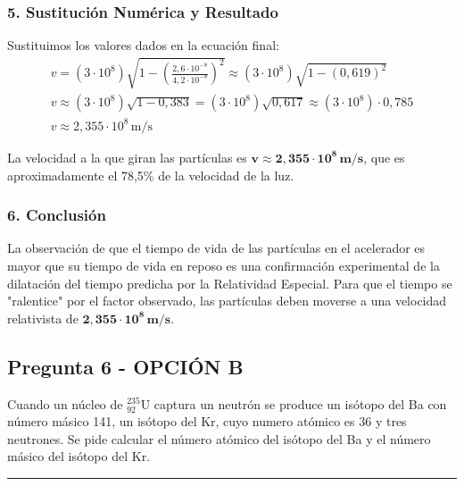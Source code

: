 \subsubsection*{5. Sustitución Numérica y Resultado}
Sustituimos los valores dados en la ecuación final:
\begin{gather}
    v = (3 \cdot 10^8) \sqrt{1 - \left(\frac{2,6 \cdot 10^{-8}}{4,2 \cdot 10^{-8}}\right)^2} \approx (3 \cdot 10^8) \sqrt{1 - (0,619)^2} \\
    v \approx (3 \cdot 10^8) \sqrt{1 - 0,383} = (3 \cdot 10^8) \sqrt{0,617} \approx (3 \cdot 10^8) \cdot 0,785 \\
    v \approx 2,355 \cdot 10^8 \, \text{m/s}
\end{gather}
\begin{cajaresultado}
    La velocidad a la que giran las partículas es $\boldsymbol{v \approx 2,355 \cdot 10^8 \, \textbf{m/s}}$, que es aproximadamente el 78,5\% de la velocidad de la luz.
\end{cajaresultado}

\subsubsection*{6. Conclusión}
\begin{cajaconclusion}
La observación de que el tiempo de vida de las partículas en el acelerador es mayor que su tiempo de vida en reposo es una confirmación experimental de la dilatación del tiempo predicha por la Relatividad Especial. Para que el tiempo se "ralentice" por el factor observado, las partículas deben moverse a una velocidad relativista de $\mathbf{2,355 \cdot 10^8 \, m/s}$.
\end{cajaconclusion}

\newpage

\subsection{Pregunta 6 - OPCIÓN B}
\label{subsec:6B_2002_jun_ord}

\begin{cajaenunciado}
Cuando un núcleo de ${}_{92}^{235}\text{U}$ captura un neutrón se produce un isótopo del Ba con número másico 141, un isótopo del Kr, cuyo numero atómico es 36 y tres neutrones. Se pide calcular el número atómico del isótopo del Ba y el número másico del isótopo del Kr.
\end{cajaenunciado}
\hrule

